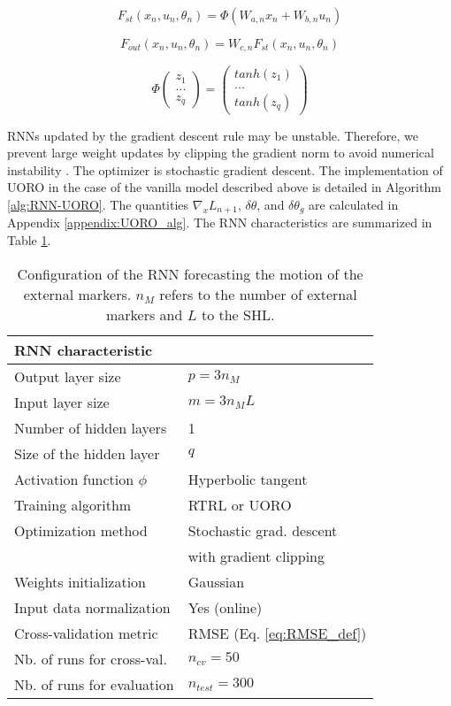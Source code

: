 \documentclass[twocolumn,a4paper]{svjour3} \sloppy          \smartqed
\begin{document}
\begin{equation} \label{eq:state_vanilla}
F_{st}(x_n, u_n, \theta_n) = \Phi(W_{a,n} x_n + W_{b,n} u_n)
\end{equation}

\begin{equation} \label{eq:measurement_vanilla}
F_{out}(x_n, u_n, \theta_n) = W_{c,n} F_{st}(x_n, u_n, \theta_n)
\end{equation}

\begin{equation}\label{eq:non_linearity}
\Phi \left(
\begin{matrix}
z_1\\
...\\
z_q
\end{matrix}
\right) 
=
\begin{pmatrix}
tanh (z_1)\\
...\\
tanh (z_q)
\end{pmatrix}
\end{equation}


RNNs updated by the gradient descent rule may be unstable. Therefore, we prevent large weight updates by clipping the gradient norm to avoid numerical instability \cite{pascanu2013difficulty}. The optimizer is stochastic gradient descent. The implementation of UORO in the case of the vanilla model described above is detailed in Algorithm \ref{alg:RNN-UORO}. The quantities $\nabla_x L_{n+1}$, $\delta \theta$, and $\delta \theta_g$ are calculated in Appendix \ref{appendix:UORO_alg}. The RNN characteristics are summarized in Table \ref{table:RNNs_configuration}.

\begin{table}[thb!]
\normalsize
\setlength{\tabcolsep}{5pt}
\begin{tabular}{ll}
\hline
RNN characteristic &  \\
\hline
Output layer size       & $p = 3 n_M $ \\
Input layer size        & $m = 3 n_M L$\\
Number of hidden layers & 1 \\
Size of the hidden layer & $q$ \\
Activation function $\phi$ &  Hyperbolic tangent \\
Training algorithm &  RTRL or UORO\\
Optimization method & Stochastic grad. descent \\ 
                    & with gradient clipping \\
Weights initialization & Gaussian \\
Input data normalization & Yes (online)\\
Cross-validation metric & RMSE (Eq. \ref{eq:RMSE_def}) \\
Nb. of runs for cross-val. & $n_{cv}=50$\\
Nb. of runs for evaluation & $n_{test}=300$ \\
\hline
\end{tabular}
\caption{Configuration of the RNN forecasting the motion of the external markers. $n_M$ refers to the number of external markers and $L$ to the SHL.}
\label{table:RNNs_configuration}
\end{table} 
\end{document}
